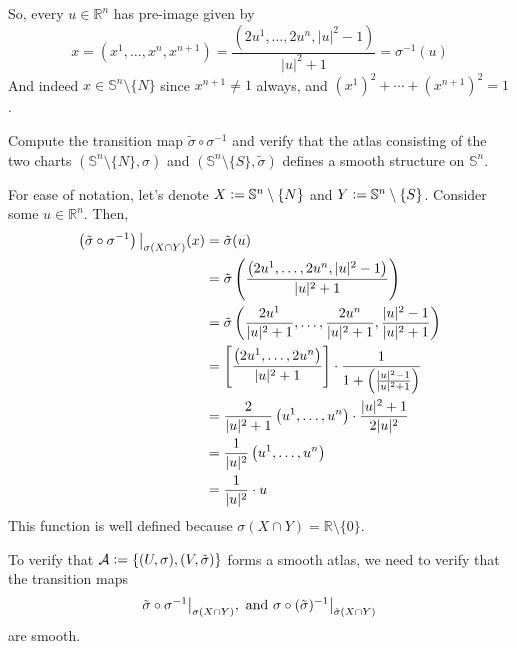 \documentclass{article}
\newcommand{\R}{\mathbb{R}}
\newcommand{\defeq}{\vcentcolon=}
\newcommand{\restr}[2]{{%
  \left.\kern-\nulldelimiterspace %
  #1 %
  \vphantom{\big|} %
  \right|_{#2} %
  }}
\begin{document}
\begin{enumerate}[label=(\alph*)]
\begin{enumerate}[label=(\arabic*),ref=\arabic*]
    \vskip 0.5cm
    So, every $u \in \R^n$ has pre-image given by 
    \[\boxed{ x = (x^1, \dots, x^n, x^{n+1}) = \frac{\left( 2u^1, \dots, 2u^{n}, \lvert u \rvert^2 - 1 \right)}{\lvert u \rvert^2 + 1} = \sigma^{-1}(u) } \]
    And indeed $x \in \mathbb{S}^n \setminus \{N\}$ since $x^{n+1} \neq 1$ always, and $(x^1)^2 + \cdots + (x^{n+1})^2 = 1$.
  \end{enumerate}

  \vskip 0.5cm
  \begin{dottedbox}
    \item Compute the transition map $\tilde{\sigma} \circ \sigma^{-1}$ and verify that the atlas consisting of the two charts $(\mathbb{S}^{n} \setminus \{N\}, \sigma)$ and $(\mathbb{S}^{n} \setminus \{S\}, \tilde{\sigma})$ defines a smooth structure on $\mathbb{S}^n$.
  \end{dottedbox}

  \vskip 0.5cm
  For ease of notation, let's denote $X \defeq \mathbb{S}^{n} \setminus \{N\}$ and $Y \defeq \mathbb{S}^{n} \setminus \{S\}$. Consider some $u \in \mathbb{R}^n$. Then, 
  \begin{align*}
    \restr{\left(\tilde{\sigma} \circ \sigma^{-1}\right)}{\sigma(X \cap Y)}(x) &= \tilde{\sigma}(u) \\
    &= \tilde{\sigma}\left( \frac{\left( 2u^1, \dots, 2u^n, \lvert u \rvert^2 - 1 \right)}{\lvert u \rvert^2 + 1} \right) \\
    &= \tilde{\sigma}\left( \frac{2u^1}{\lvert u \rvert^2 + 1}, \dots,  \frac{2u^n}{\lvert u \rvert^2 + 1},  \frac{\lvert u \rvert^2 - 1}{\lvert u \rvert^2 + 1} \right) \\
    &= \left[ 
      \frac{\left(  2u^1, \dots, 2u^n\right)}{|u|^2 + 1}
     \right] \cdot \frac{1}{1+ \left( \frac{|u|^2 - 1}{|u|^2 + 1} \right)} \\
     &= \frac{2}{|u|^2 + 1} \left( u^1, \dots, u^n \right) \cdot \frac{|u|^2 + 1}{2|u|^2} \\
     &= \frac{1}{|u|^2} \left( u^1, \dots, u^n \right) \\
     &= \frac{1}{|u|^2} \cdot u
  \end{align*}
  This function is well defined because $\sigma(X \cap Y) = \R \setminus \{0\}$.

  \vskip 0.5cm
  To verify that $\mathcal{A} \defeq \{ (U, \sigma), (V, \tilde{\sigma}) \}$ forms a smooth atlas, we need to verify that the transition maps 
  \[ \restr{\tilde{\sigma} \circ \sigma^{-1}}{\sigma(X \cap Y)}, \text{  and  }\restr{\sigma \circ (\tilde{\sigma})^{-1}}{\tilde{\sigma}(X \cap Y)} \]
  are smooth.


\end{enumerate}
\end{document}
